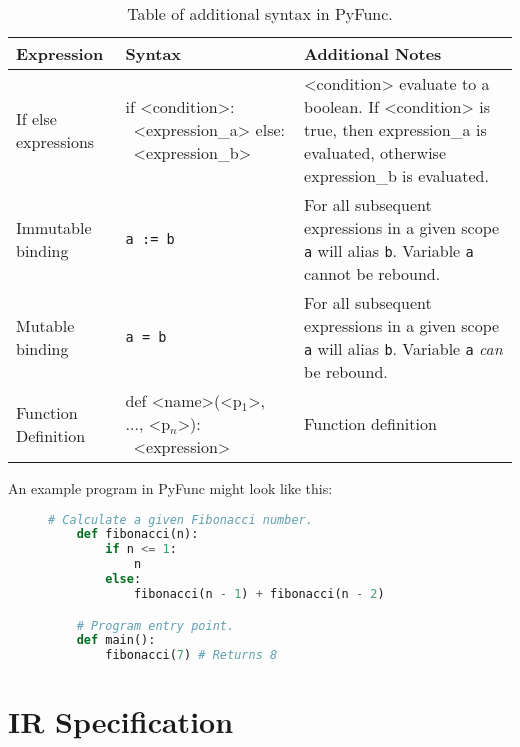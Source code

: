 \documentclass{l4proj}
\begin{document}
\begin{table}[!h]
    \caption{Table of additional syntax in PyFunc.}
    \begin{center}

    \begin{tabular}{@{}|l|p{5cm}|p{4cm}|@{}}
        \hline
        \textbf{Expression}  &   \textbf{Syntax}     &   \textbf{Additional Notes}   \\
        \hline
        \hline
        If else expressions & if <condition>: \newline \-\ <expression\_a> \newline else: \newline \-\ <expression\_b> & <condition> evaluate to a boolean. If <condition> is true, then expression\_a is evaluated, otherwise expression\_b is evaluated.\\
        \hline
        Immutable binding   & \texttt{a := b}   & For all subsequent expressions in a given scope \texttt{a} will alias \texttt{b}. Variable \texttt{a} cannot be rebound. \\
        \hline
        Mutable binding & \texttt{a = b} & For all subsequent expressions in a given scope \texttt{a} will alias \texttt{b}. Variable \texttt{a} \emph{can} be rebound.\\
        \hline
        Function Definition & def <name>(<p$_1$>, ..., <p$_n$>): \newline \-\ <expression> & Function definition\\
        \hline
        
    \end{tabular}
    \end{center}
\end{table}

An example program in PyFunc might look like this:
\begin{figure}[!h]
\begin{lstlisting}[language=python, caption={The simple recursive function to calculate a given fibonacci number.}, label=lst:callahan]
    # Calculate a given Fibonacci number.
    def fibonacci(n):
        if n <= 1:
            n
        else:
            fibonacci(n - 1) + fibonacci(n - 2)

    # Program entry point.
    def main():
        fibonacci(7) # Returns 8
\end{lstlisting}
\end{figure}

\section{IR Specification}
\end{document}
